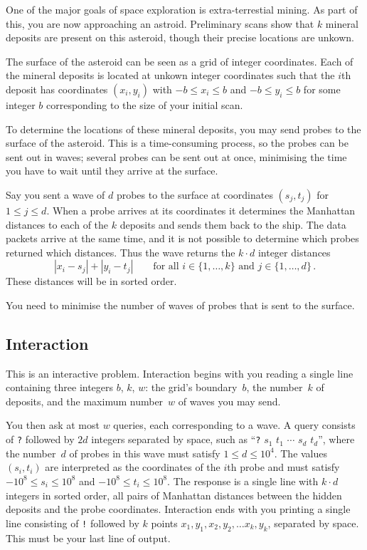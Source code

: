 

\noindent
One of the major goals of space exploration is extra-terrestial mining. 
As part of this, you are now approaching an astroid. 
Preliminary scans show that $k$ mineral deposits are present on this asteroid, though their precise locations are unkown.

\medskip

The surface of the asteroid can be seen as a grid of integer coordinates.
Each of the mineral deposits is located at unkown integer coordinates such that the $i$th deposit has coordinates $(x_i, y_i)$ with  
$-b \le x_i \le b$ and $-b\le y_i \le b$ %
for some integer $b$ corresponding to the size of your initial scan.

To determine the locations of these mineral deposits, you may send probes to the surface of the asteroid. 
This is a time-consuming process, so the probes can be sent out in waves;
several probes can be sent out at once, minimising the time you have to wait until they arrive at the surface.

Say you sent a wave of $d$ probes to the surface at coordinates $(s_j,t_j)$ for $1\leq j\leq d$.
When a probe arrives at its coordinates it determines the Manhattan distances to each of the $k$ deposits and sends them back to the ship. 
The data packets arrive at the same time, and it is not possible to determine which probes returned which distances. 
Thus the wave returns the $k\cdot d$ integer distances
\[|x_i-s_j| + |y_i - t_j| \qquad\text{for all } i \in \{1,\ldots,k\} \text{ and } j \in\{ 1,\ldots,d\}\,.\]
These distances will be in sorted order.

You need to minimise the number of waves of probes that is sent to the surface.


\subsection*{Interaction}

This is an interactive problem.
Interaction begins with you reading a single line containing three integers $b$, $k$, $w$:
the grid's boundary~$b$,
the number~$k$ of deposits,
and the maximum number~$w$ of waves you may send.

You then ask at most $w$ queries, each corresponding to a wave.
A query consists of \texttt{?} followed by $2d$ integers separated by space, such as ``\texttt{?} $s_1$ $t_1$ $\cdots$ $s_d$ $t_d$'', where the number~$d$ of probes in this wave must satisfy
$1\leq d\leq 10^4$. %
The values $(s_i,t_i)$ are interpreted as the coordinates of the $i$th probe and must satisfy
$-10^8 \leq s_i \leq 10^8$ and $-10^8 \leq t_i \leq 10^8$. %
The response is a single line with $k \cdot d$ integers in sorted order, all pairs of Manhattan distances between the hidden deposits and the probe coordinates.
Interaction ends with you printing a single line consisting of \texttt{!} followed by $k$ points $x_1, y_1, x_2, y_2, \ldots x_k, y_k$, separated by space.
This must be your last line of output.

